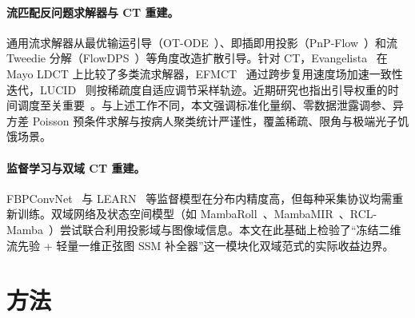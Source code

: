 \documentclass[11pt,UTF8]{ctexart}
\begin{document}
\paragraph{流匹配反问题求解器与 CT 重建。}
通用流求解器从最优输运引导（OT-ODE~\cite{pokle2024otode}）、即插即用投影（PnP-Flow~\cite{martin2025pnpflow}）和流 Tweedie 分解（FlowDPS~\cite{kim2025flowdps}）等角度改造扩散引导。针对 CT，Evangelista~\cite{evangelista2026pgfm} 在 Mayo LDCT 上比较了多类流求解器，EFMCT~\cite{eFMCT2026} 通过跨步复用速度场加速一致性迭代，LUCID~\cite{lucid2026} 则按稀疏度自适应调节采样轨迹。近期研究也指出引导权重的时间调度至关重要~\cite{moroy2026guidanceweights,barthakur2026leegs,bang2026trips}。与上述工作不同，本文强调标准化量纲、零数据泄露调参、异方差 Poisson 预条件求解与按病人聚类统计严谨性，覆盖稀疏、限角与极端光子饥饿场景。

\paragraph{监督学习与双域 CT 重建。}
FBPConvNet~\cite{jin2017fbpconvnet} 与 LEARN~\cite{chen2018learn} 等监督模型在分布内精度高，但每种采集协议均需重新训练。双域网络及状态空间模型（如 MambaRoll~\cite{kabas2024mambaroll}、MambaMIR~\cite{huang2024mambamir}、RCL-Mamba~\cite{duan2026rclmamba}）尝试联合利用投影域与图像域信息。本文在此基础上检验了“冻结二维流先验 + 轻量一维正弦图 SSM 补全器”这一模块化双域范式的实际收益边界。

\section{方法}
\end{document}
